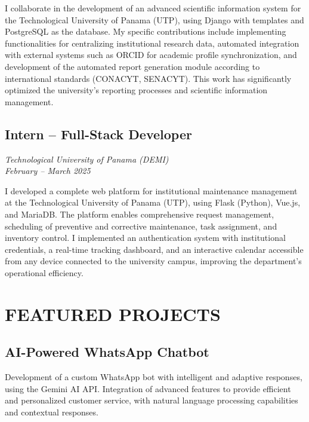 \documentclass[11pt,a4paper]{article}
\begin{document}
I collaborate in the development of an advanced scientific information system for the Technological University of Panama (UTP), using Django with templates and PostgreSQL as the database. My specific contributions include implementing functionalities for centralizing institutional research data, automated integration with external systems such as ORCID for academic profile synchronization, and development of the automated report generation module according to international standards (CONACYT, SENACYT). This work has significantly optimized the university's reporting processes and scientific information management.

\vspace{4pt}

\subsection*{Intern -- Full-Stack Developer}
\textit{Technological University of Panama (DEMI)}\\
\textit{February -- March 2025}

I developed a complete web platform for institutional maintenance management at the Technological University of Panama (UTP), using Flask (Python), Vue.js, and MariaDB. The platform enables comprehensive request management, scheduling of preventive and corrective maintenance, task assignment, and inventory control. I implemented an authentication system with institutional credentials, a real-time tracking dashboard, and an interactive calendar accessible from any device connected to the university campus, improving the department's operational efficiency.

\section*{FEATURED PROJECTS}

\subsection*{AI-Powered WhatsApp Chatbot}
Development of a custom WhatsApp bot with intelligent and adaptive responses, using the Gemini AI API. Integration of advanced features to provide efficient and personalized customer service, with natural language processing capabilities and contextual responses.

\vspace{4pt}
\end{document}
